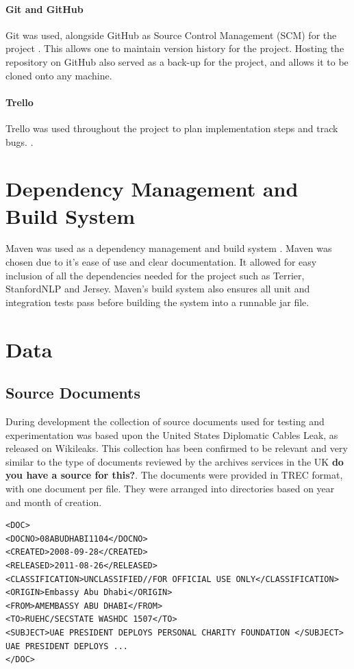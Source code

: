 \documentclass{l4proj}
\begin{document}
\paragraph{Git and GitHub}
Git was used, alongside GitHub as Source Control Management (SCM) for the project \cite{git} \cite{github}. This allows one to maintain version history for the project. Hosting the repository on GitHub also served as a back-up for the project, and allows it to be cloned onto any machine.
\paragraph{Trello}
Trello was used throughout the project to plan implementation steps and track bugs. \cite{trello}.
\section{Dependency Management and Build System}
Maven was used as a dependency management and build system \cite{maven}. Maven was chosen due to it's ease of use and clear documentation. It allowed for easy inclusion of all the dependencies needed for the project such as Terrier, StanfordNLP and Jersey. Maven's build system also ensures all unit and integration tests pass before building the system into a runnable jar file.

\section{Data}
\subsection{Source Documents}
During development the collection of source documents used for testing and experimentation was based upon the United States Diplomatic Cables Leak, as released on Wikileaks. This collection has been confirmed to be relevant and very similar to the type of documents reviewed by the archives services in the UK \textbf{do you have a source for this?}. The documents were provided in TREC format, with one document per file. They were arranged into directories based on year and month of creation.
\begin{verbatim}
<DOC>
<DOCNO>08ABUDHABI1104</DOCNO>
<CREATED>2008-09-28</CREATED>
<RELEASED>2011-08-26</RELEASED>
<CLASSIFICATION>UNCLASSIFIED//FOR OFFICIAL USE ONLY</CLASSIFICATION>
<ORIGIN>Embassy Abu Dhabi</ORIGIN>
<FROM>AMEMBASSY ABU DHABI</FROM>
<TO>RUEHC/SECSTATE WASHDC 1507</TO>
<SUBJECT>UAE PRESIDENT DEPLOYS PERSONAL CHARITY FOUNDATION </SUBJECT>
UAE PRESIDENT DEPLOYS ...
</DOC>
\end{verbatim}
\end{document}

